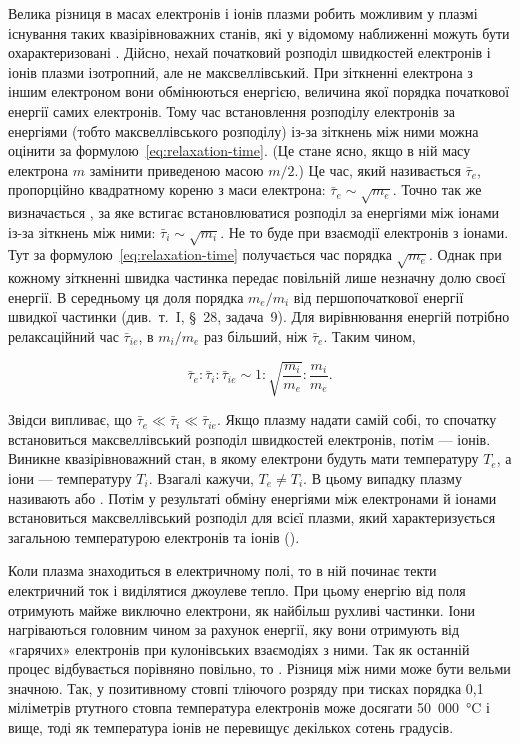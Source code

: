 Велика різниця в масах електронів і іонів плазми робить можливим у плазмі існування таких квазірівноважних станів, які у відомому наближенні можуть бути охарактеризовані . Дійсно, нехай початковий розподіл швидкостей електронів і іонів плазми ізотропний, але не максвеллівський. При зіткненні електрона з іншим електроном вони обмінюються енергією, величина якої порядка початкової енергії самих електронів. Тому час встановлення розподілу електронів за енергіями (тобто максвеллівського розподілу) із-за зіткнень між ними можна оцінити за формулою~\eqref{eq:relaxation-time}. (Це стане ясно, якщо в ній масу електрона $m$ замінити приведеною масою $m/2$.) Це час, який називається  $\bar{\tau}_e$, пропорційно квадратному кореню з маси електрона: $\bar{\tau}_e \sim \sqrt{m_e}$. Точно так же визначається , за яке встигає встановлюватися розподіл за енергіями між іонами із-за зіткнень між ними: $\bar{\tau}_i \sim \sqrt{m_i}$. Не то буде при взаємодії електронів з іонами. Тут за формулою~\eqref{eq:relaxation-time} получається час порядка $\sqrt{m_e}$. Однак при кожному зіткненні швидка частинка передає повільній лише незначну долю своєї енергії. В середньому ця доля порядка $m_e/m_i$ від першопочаткової енергії швидкої частинки (див.~т.~I, \S~28, задача~9). Для вирівнювання енергій потрібно релаксаційний час $\bar{\tau}_{ie}$, в $m_i/m_e$ раз більший, ніж $\bar{\tau}_e$. Таким чином,

\begin{equation}\label{eq:relaxation-times-ratio}
	\bar{\tau}_e : \bar{\tau}_i : \bar{\tau}_{ie} \sim 1 : \sqrt{\frac{m_i}{m_e}} : \frac{m_i}{m_e}.
\end{equation}

Звідси випливає, що $\bar{\tau}_e \ll \bar{\tau}_i \ll \bar{\tau}_{ie}$. Якщо плазму надати самій собі, то спочатку встановиться максвеллівський розподіл швидкостей електронів, потім --- іонів. Виникне квазірівноважний стан,
в якому електрони будуть мати температуру $T_e$, а іони --- температуру $T_i$. Взагалі кажучи, $T_e \neq T_i$. В цьому випадку плазму називають  або . Потім у результаті обміну енергіями між електронами й іонами встановиться максвеллівський розподіл для всієї плазми, який характеризується загальною температурою електронів та іонів ().

Коли плазма знаходиться в електричному полі, то в ній починає текти електричний ток і виділятися джоулеве тепло. При цьому енергію від поля отримують майже виключно електрони, як найбільш рухливі частинки. Іони нагріваються головним чином за рахунок енергії, яку вони отримують від «гарячих» електронів при кулонівських взаємодіях з ними. Так як останній процес відбувається порівняно повільно, то . Різниця між ними може бути вельми значною. Так, у позитивному стовпі тліючого розряду при тисках порядка 0,1 міліметрів ртутного стовпа температура електронів може досягати 50~000~°C і вище, тоді як температура іонів не перевищує декількох сотень градусів.

